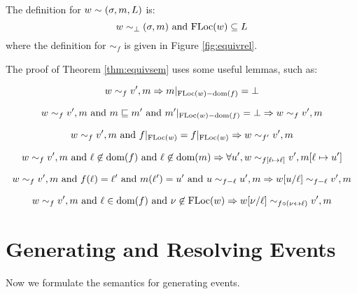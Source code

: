 \documentclass{article}
\begin{document}
The definition for $w\sim(\sigma,m,L)$ is:
\[w\sim_\bot(\sigma,m)\text{ and }\text{FLoc}(w)\subseteq L\]
where the definition for $\sim_f$ is given in Figure \ref{fig:equivrel}.

The proof of Theorem \ref{thm:equivsem} uses some useful lemmas, such as:
\begin{lem}
	\[w\sim_f v',m\Rightarrow m|_{\text{FLoc}(w)-\text{dom}(f)}=\bot\]
\end{lem}

\begin{lem}
	\[w\sim_f v',m\text{ and }m\sqsubseteq m'\text{ and }m'|_{\text{FLoc}(w)-\text{dom}(f)}=\bot\Rightarrow w\sim_f v',m\]
\end{lem}

\begin{lem}
	\[w\sim_f v',m\text{ and }f|_{\text{FLoc}(w)}=f|_{\text{FLoc}(w)}\Rightarrow w\sim_{f'}v',m\]
\end{lem}

\begin{lem}
	\[w\sim_f v',m\text{ and }\ell\not\in\text{dom}(f)\text{ and }\ell\not\in\text{dom}(m)\Rightarrow\forall u',w\sim_{f[\ell\mapsto\ell]}v',m[\ell\mapsto u']\]
\end{lem}

\begin{lem}
	\[w\sim_f v',m\text{ and }f(\ell)=\ell'\text{ and }m(\ell')=u'\text{ and }u\sim_{f-\ell}u',m\Rightarrow w[u/\ell]\sim_{f-\ell}v',m\]
\end{lem}

\begin{lem}
	\[w\sim_f v',m\text{ and }\ell\in\text{dom}(f)\text{ and }\nu\not\in\text{FLoc}(w)\Rightarrow w[\nu/\ell]\sim_{f\circ(\nu\leftrightarrow\ell)}v',m\]
\end{lem}
\clearpage
\section{Generating and Resolving Events}
Now we formulate the semantics for generating events.
\end{document}
